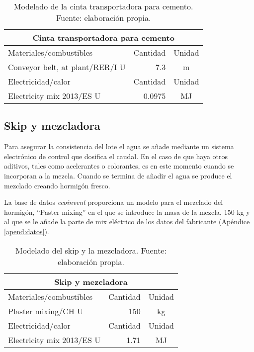 \begin{table}[!htb]
\centering
\begin{tabular}{p{8cm}rc}
\toprule
\multicolumn{3}{c}{Cinta transportadora para cemento}\\
\midrule
Materiales/combustibles & Cantidad & Unidad\\
\midrule
Conveyor belt, at plant/RER/I U & 7.3 & \si{m}\\
\midrule
Electricidad/calor & Cantidad & Unidad\\
\midrule
Electricity mix 2013/ES U & 0.0975 & \si{MJ}\\
\bottomrule
\end{tabular}
\caption[Modelado de la cinta transportadora para cemento.]{Modelado de la cinta transportadora para cemento. Fuente: elaboración propia.}
\label{modeladodecintacemento}
\end{table}

\subsection{Skip y mezcladora}

Para asegurar la consistencia del lote el agua se añade mediante un sistema electrónico de control que dosifica el caudal. En el caso de que haya otros aditivos, tales como acelerantes o colorantes, es en este momento cuando se incorporan a la mezcla. Cuando se termina de añadir el agua se produce el mezclado creando hormigón fresco.

La base de datos \textit{ecoinvent} proporciona un modelo para el mezclado del hormigón, ``Paster mixing'' en el que se introduce la masa de la mezcla, 150 \si{kg} y al que se le añade la parte de mix eléctrico de los datos del fabricante (Apéndice \ref{apend:datos}).

\begin{table}[!htb]
\centering
\begin{tabular}{p{8cm}rc}
\toprule
\multicolumn{3}{c}{Skip y mezcladora}\\
\midrule
Materiales/combustibles & Cantidad & Unidad\\
\midrule
Plaster mixing/CH U & 150 & \si{kg}\\
\midrule
Electricidad/calor & Cantidad & Unidad\\
\midrule
Electricity mix 2013/ES U & 1.71 & \si{MJ}\\
\bottomrule
\end{tabular}
\caption[Modelado del skip y la mezcladora.]{Modelado del skip y la mezcladora. Fuente: elaboración propia.}
\label{modeladoskip}
\end{table}

